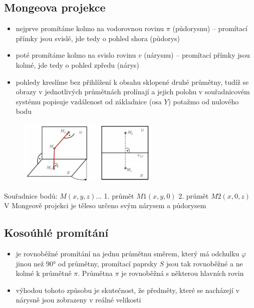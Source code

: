 \subsection{Mongeova projekce}
\begin{itemize}
	\item nejprve promítáme kolmo na vodorovnou rovinu $\pi$ (půdorysnu) -- promítací přímky jsou svislé, jde tedy o pohled shora (půdorys)
	\item poté promítáme kolmo na svislo rovinu $v$ (nárysnu) -- promítací přímky jsou kolmé, jde tedy o pohled zpředu (nárys)
	\item pohledy kreslíme bez přihlížení k obsahu sklopené druhé průmětny, tudíž se obrazy v jednotlivých průmětnách prolínají a jejich polohu v souřadnicovém systému popisuje vzdálenost od základnice (osa $Y$) potažmo od nulového bodu
\end{itemize}
\begin{figure}[H]
\centering
\includegraphics[width=0.6\textwidth]{assets/2_mongeova}
\end{figure}
Souřadnice bodů: $M(x, y, z)$... 1. průmět $M1 (x, y, 0)$ 2. průmět $M2 (x, 0, z)$\\
V Mongeově projekci je těleso určeno svým nárysem a půdorysem
\subsection{Kosoúhlé promítání}
\begin{itemize}
	\item je rovnoběžné promítání na jednu průmětnu směrem, který má odchulku $\varphi$ jinou než \ang{90} od průmětny, promítací paprsky $S$ jsou tak rovnoběžné a ne kolmé k průmětně $\pi$. Průmětna $\pi$ je rovnoběžná s některou hlavních rovin
	\item výhodou tohoto způsobu je skutečnost, že předměty, které se nacházejí v nárysně jsou zobrazeny v reálné velikosti
\end{itemize}
